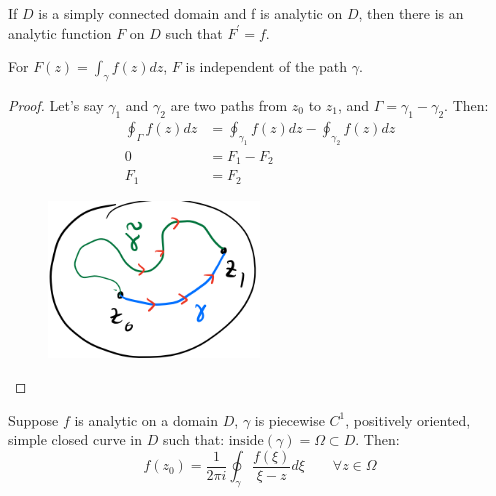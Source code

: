 \begin{theorem}
    If $D$ is a simply connected domain and f is analytic on $D$, then there is an analytic function $F$ on $D$ such that $F^\prime = f$.
\end{theorem}
\begin{lemma}
    For $F(z) = \int_{\gamma}f(z)dz$, $F$ is independent of the path $\gamma$.
\end{lemma}
\begin{proof}
    Let's say $\gamma_1$ and $\gamma_2$ are two paths from $z_0$ to $z_1$, and $\Gamma = \gamma_1 - \gamma_2$. Then:
    \begin{align*}
        \oint_{\Gamma} f(z) dz & = \oint_{\gamma_1} f(z) dz - \oint_{\gamma_2} f(z) dz \\
        0                      & = F_1 - F_2                                           \\
        F_1                    & = F_2
    \end{align*}
    \begin{figure}[H]
        \centering
        \includegraphics[width=0.5\textwidth]{LECTURE_7/independent.png}
    \end{figure}
\end{proof}
\begin{theorem}
    Suppose $f$ is analytic on a domain $D$, $\gamma$ is piecewise $C^1$, positively oriented, simple closed curve in $D$ such that: $\text{inside}( \gamma) = \Omega \subset D$. Then:
    $$f(z_0) = \frac{1}{2\pi i} \oint_{\gamma} \frac{f(\xi)}{\xi - z} d\xi\qquad \forall z \in \Omega$$
\end{theorem}

